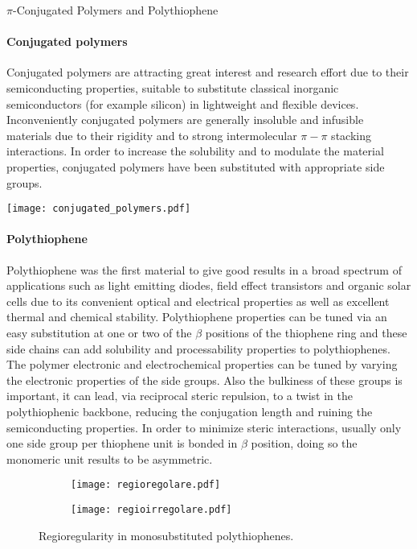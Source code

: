\begin{section}{$\pi$-Conjugated Polymers and Polythiophene}
\paragraph{Conjugated polymers} Conjugated polymers are attracting great interest and research effort due to their semiconducting properties, suitable to substitute classical inorganic semiconductors (for example silicon) in lightweight and flexible devices. Inconveniently conjugated polymers are generally insoluble and infusible materials due to their rigidity and to strong intermolecular $\pi-\pi$ stacking interactions. In order to increase the solubility and to modulate the material properties, conjugated polymers have been substituted with appropriate side groups.

\begin{SCfigure}[][tbp]%
\centering
\texttt{[image: conjugated\_polymers.pdf]}
\caption{Some conjugated polymers.}
\label{fig:conjugated_polymers}
\end{SCfigure}

\paragraph{Polythiophene} Polythiophene was the first material to give good results in a broad spectrum of applications such as light emitting diodes, field effect transistors and organic solar cells due to its convenient optical and electrical properties as well as excellent thermal and chemical stability. Polythiophene properties can be tuned via an easy substitution at one or two of the $\beta$ positions of the thiophene ring and these side chains can add solubility and processability properties to poly\-thio\-phenes. 
The polymer electronic and electrochemical properties can be tuned by varying the electronic properties of the side groups. Also the bulkiness of these groups is important, it can lead, via reciprocal steric repulsion, to a twist in the poly\-thiophenic backbone, reducing the conjugation length and ruining the semiconducting properties. In order to minimize steric interactions, usually only one side group per thiophene unit is bonded in $\beta$ position, doing so the monomeric unit results to be asymmetric. 

\begin{figure}[tbp]%
\begin{subfigure}[b]{0.47\textwidth}
\texttt{[image: regioregolare.pdf]}
\label{fig:regioregolare}
\end{subfigure}
\qquad
\begin{subfigure}[b]{0.47\textwidth}
\texttt{[image: regioirregolare.pdf]}
\label{fig:regioirregolare}
\end{subfigure}
\caption{Regioregularity in monosubstituted polythiophenes.}\label{fig:regioregolare-regioirregolare}
\end{figure}


\end{section}
